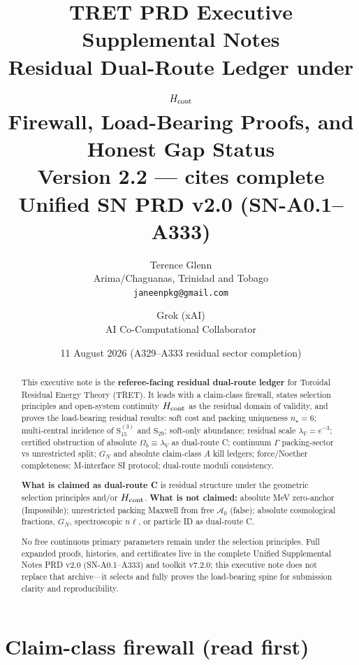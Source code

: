\documentclass[11pt,a4paper]{article}
\title{\textbf{TRET PRD Executive Supplemental Notes}\\[0.35em]
\large Residual Dual-Route Ledger under $H_{\rm cont}$\\
Firewall, Load-Bearing Proofs, and Honest Gap Status\\[0.2em]
\normalsize Version 2.2 --- cites complete Unified SN PRD v2.0 (SN-A0.1--A333)}
\author{Terence Glenn\\
{\small Arima/Chaguanas, Trinidad and Tobago}\\
{\small\texttt{janeenpkg@gmail.com}}
\and
Grok (xAI)\\
{\small AI Co-Computational Collaborator}}
\date{11 August 2026 (A329--A333 residual sector completion)}
\theoremstyle{remark}
\begin{document}
\maketitle

\begin{abstract}
This executive note is the \textbf{referee-facing residual dual-route ledger} for Toroidal Residual Energy Theory (TRET). It leads with a claim-class firewall, states selection principles and open-system continuity $H_{\rm cont}$ as the residual domain of validity, and proves the load-bearing residual results: soft cost and packing uniqueness $n_\star=6$; multi-central incidence of $\mathrm{S}_{15}^{(3)}$ and $\mathrm{S}_{29}$; soft-only abundance; residual scale $\lambda_V=e^{-3}$; certified obstruction of absolute $\Omega_b\equiv\lambda_V$ as dual-route C; continuum $\Gamma$ packing-sector vs unrestricted split; $G_N$ and absolute claim-class $A$ kill ledgers; force/Noether completeness; M-interface SI protocol; dual-route moduli consistency.

\textbf{What is claimed as dual-route C} is residual structure under the geometric selection principles and/or $H_{\rm cont}$.
\textbf{What is not claimed:} absolute MeV zero-anchor (Impossible); unrestricted packing Maxwell from free $\mathcal{A}_0$ (false); absolute cosmological fractions, $G_N$, spectroscopic $n\ell$, or particle ID as dual-route C.

No free continuous primary parameters remain under the selection principles.
Full expanded proofs, histories, and certificates live in the complete Unified Supplemental Notes PRD v2.0 (SN-A0.1--A333) and toolkit v7.2.0; this executive note does not replace that archive---it selects and fully proves the load-bearing spine for submission clarity and reproducibility.
\end{abstract}

\tableofcontents
\vspace{0.5em}

\section{Claim-class firewall (read first)}
\label{sec:firewall}
\end{document}
